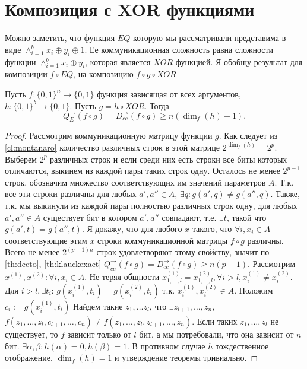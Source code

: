 \documentclass{article}
\begin{document}
\section{Композиция с XOR функциями}
\label{sec:xordet}
Можно заметить, что функция $EQ$ которую мы рассматривали представима в виде $\wedge_{i=1}^{b}x_i\oplus y_i\oplus 1$. Ее коммуникационная сложность равна сложности функции $\wedge_{i=1}^{b}x_i\oplus y_i$, которая является $XOR$ функцией. Я обобщу результат для композиции $f \circ EQ$, на композицию $f \circ g \circ XOR$
\begin{theorem} 
    \label{th:xor}
    Пусть $f: \{0, 1\}^{n} \to \{0, 1\}$ функция зависящая от всех аргументов, $h: \{0, 1\}^{b} \to \{0, 1\}$. Пусть $g = h \circ XOR$. Тогда 
    $$Q_{E}^{\to}(f\circ g) = D_{cc}^{\to}(f \circ g) \geq n (\dim_f(h) - 1).$$
\begin{proof}
    Рассмотрим коммуникационную матрицу функции $g$. Как следует из \autoref{cl:montanaro} количество различных строк в этой матрице $2^{\dim_f(h)} = 2^p$. Выберем $2^p$ различных строк и если среди них есть строки все биты которых отличаются, выкинем из каждой пары таких строк одну. Осталось не менее $2^{p - 1}$ строк, обозначим множество соответствующих им значений параметров $A$. Т.к. все эти строки различны для любых $a', a'' \in A$, $\exists q: g(a', q) \neq g(a'', q)$. Также, т.к. мы выкинули из каждой пары полностью различных строк одну, для любых $a', a'' \in A$ существует бит в котором $a', a''$ совпадают, т.е. $\exists t$, такой что $g(a', t) = g(a'', t)$. Я докажу, что для любого $x$ такого, что $ \forall i, x_i \in A$ соответствующие этим $x$ строки коммуникационной матрицы $f \circ g$ различны. Всего не менее $2^{(p - 1)n}$ строк удовлетворяют этому свойству, значит по \autoref{th:dccto}, \autoref{th:klauckexact} $Q_{cc}^{\to}(f \circ g) = D_{cc}^{\to}(f \circ g) \geq n (p - 1)$.
    Рассмотрим $x^{(1)}, x^{(2)} : \forall i, x_i \in A$. Не теряя общности  $x^{(1)}_{1,\ldots, l} = x^{(2)}_{1, \ldots, l}, \forall i > l, x^{(1)}_{i} \neq x^{(2)}_{i}$. Для $i > l, \exists t_i$: $g(x^{(1)}_i, t_i) = g(x^{(2)}_i, t_i)$ т.к. $x_{i}^{(1)}, x_{i}^{(2)} \in A$. Положим $c_i := g(x^{(1)}_i, t_i)$ Найдем такие $z_1, \ldots z_l$, что $\exists z_{l+1}, \ldots, z_{n}$, $f(z_1, \ldots, z_l, c_{l+1},\ldots, c_n) \neq f(z_1, \ldots, z_l, z_{l+1}, \ldots, z_{n})$. Если таких $z_1, \ldots, z_l$ не существует, то $f$ зависит только от $l$ бит, а мы потребовали, что она зависит от $n$ бит. $\exists \alpha, \beta: h(\alpha) = 0, h(\beta) = 1$. В противном случае $h$ тождественное отображение, $\dim_f(h) = 1$ и утверждение теоремы тривиально.

\end{proof}
\end{theorem}
\end{document}

